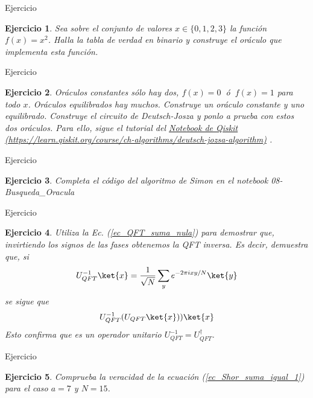 \documentclass[a4paper,11pt]{book} %
\newtheorem{ejercicio_contador}{Ejercicio}
\newcommand{\Ejercicio}[1]{
		\begin{mybox_gray}{Ejercicio} 
			\begin{ejercicio_contador}
				 #1 
			\end{ejercicio_contador} 
		\end{mybox_gray}
	}
\numberwithin{equation}{chapter}
\begin{document}
\Ejercicio{
Sea sobre el conjunto de valores $x\in \{0,1,2,3\}$ la función $f(x) = x^2$. Halla la tabla de verdad
en binario y construye el oráculo que implementa esta función.
}

\Ejercicio{
Oráculos constantes sólo hay dos, $f(x)=0~$ ó $~f(x) = 1$ para todo $x$. Oráculos equilibrados hay muchos. Construye un oráculo constante y uno
equilibrado. Construye el circuito de Deutsch-Josza y ponlo a prueba con estos dos oráculos. Para ello, sigue el tutorial del
\href{https://learn.qiskit.org/course/ch-algorithms/deutsch-jozsa-algorithm}{Notebook de Qiskit (https://learn.qiskit.org/course/ch-algorithms/deutsch-jozsa-algorithm)} .
}

\Ejercicio{
Completa el código del algoritmo de Simon en el notebook 08-Busqueda\_Oracula
}

\Ejercicio{
Utiliza la Ec. (\ref{ec_QFT_suma_nula}) para demostrar que, invirtiendo los signos de las fases obtenemos la QFT inversa. Es decir, demuestra que, si
\begin{equation}
U^{-1}_{QFT}\ket{x}  =  \frac{1}{\sqrt{N}}\sum_{y} e^{-2\pi i  xy /N} \ket{y}
\end{equation}
se sigue que
\begin{equation}
U_{QFT}^{-1}(U_{QFT} \ket{x}) ) \ket{x}
\end{equation}
Esto confirma que es un operador unitario $U_{QFT}^{-1} = U_{QFT}^\dagger$.
}

\Ejercicio{
Comprueba la veracidad de la ecuación (\ref{ec_Shor_suma_igual_1}) para el caso $a=7$ y $N=15$.
}
\end{document}
